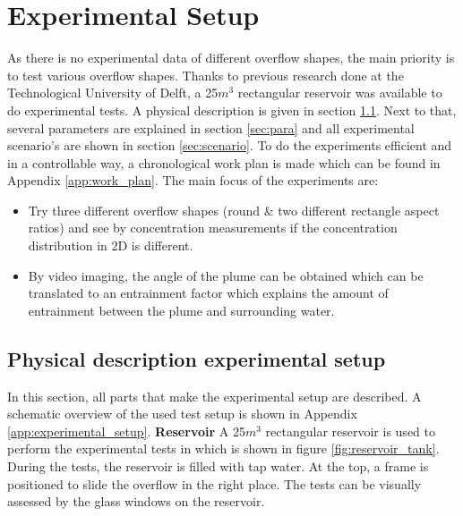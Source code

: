 \chapter{Experimental Setup}
\label{ch:test_setup}
As there is no experimental data of different overflow shapes, the main priority is to test various overflow shapes. Thanks to previous research done at the Technological University of Delft, a 25$m^3$ rectangular reservoir was available to do experimental tests. A physical description is given in section \ref{sec:phy}. Next to that, several parameters are explained in section \ref{sec:para} and all experimental scenario's are shown in section \ref{sec:scenario}. To do the experiments efficient and in a controllable way, a chronological work plan is made which can be found in Appendix \ref{app:work_plan}. The main focus of the experiments are:

\begin{itemize}
    \item Try three different overflow shapes (round \& two different rectangle aspect ratios) and see by concentration measurements if the concentration distribution in 2D is different.
    \item By video imaging, the angle of the plume can be obtained which can be translated to an entrainment factor which explains the amount of entrainment between the plume and surrounding water.
\end{itemize}

\newpage
\section{Physical description experimental setup}
\label{sec:phy}
In this section, all parts that make the experimental setup are described. A schematic overview of the used test setup is shown in Appendix \ref{app:experimental_setup}.  \newline \newline
\noindent\textbf{Reservoir}\newline
\noindent A 25$m^3$ rectangular reservoir is used to perform the experimental tests in which is shown in figure \ref{fig:reservoir_tank}. During the tests, the reservoir is filled with tap water. At the top, a frame is positioned to slide the overflow in the right place. The tests can be visually assessed by the glass windows on the reservoir.


